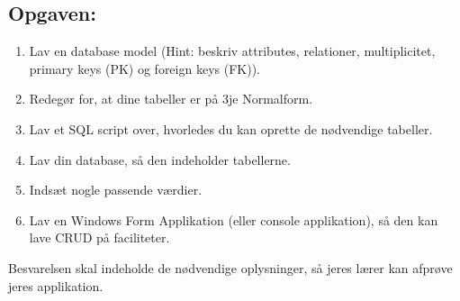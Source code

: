 \subsection{Opgaven:}
\begin{enumerate}
    \item Lav en database model (Hint: beskriv attributes, relationer, multiplicitet, primary keys (PK) og foreign keys (FK)).
    \item Redegør for, at dine tabeller er på 3je Normalform.
    \item Lav et SQL script over, hvorledes du kan oprette de nødvendige tabeller.
    \item Lav din database, så den indeholder tabellerne.
    \item Indsæt nogle passende værdier.
    \item Lav en Windows Form Applikation (eller console applikation), så den kan lave CRUD på faciliteter.
\end{enumerate}

Besvarelsen skal indeholde de nødvendige oplysninger, så jeres lærer kan afprøve jeres applikation.